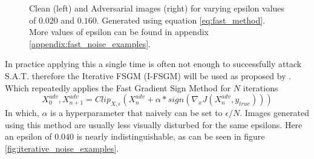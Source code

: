 \begin{figure}[H]
{        %
    }
    \caption{Clean (left) and Adversarial images (right) for varying epsilon values of $0.020$ and $0.160$. Generated using equation \ref{eq:fast_method}. More values of epsilon can be found in appendix \ref{appendix:fast_noise_examples}.}
    \label{fig:fast_noise_examples}
\end{figure}

In practice applying this a single time is often not enough to successfully attack S.A.T. therefore the Iterative FSGM (I-FSGM) will be used as proposed by \citeauthor{Kurakin}. Which repeatedly applies the Fast Gradient Sign Method for $N$ iterations
\begin{equation}
    X^{adv}_{0}, X^{adv}_{n + 1} = Clip_{X, \epsilon}(X^{adv}_{n} + \alpha * sign(\nabla_{x}J(X^{adv}_{n}, y_{true})))
    \label{eq:iterative_method}
\end{equation}
In which, $\alpha$ is a hyperparameter that naively can be set to $\epsilon / N$. Images generated using this method are usually less visually disturbed for the same epsilons. Here an epsilon of $0.040$ is nearly indistinguishable, as can be seen in figure \ref{fig:iterative_noise_examples}.

